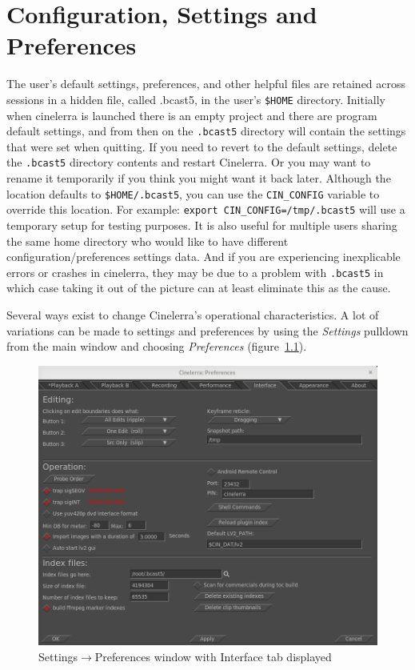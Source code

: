 
\chapter{Configuration, Settings and Preferences}%
\label{cha:configuration_settings_preferences}

The user's default settings, preferences, and other helpful files are retained across sessions in a hidden file, called .bcast5, in the user’s \texttt{\$HOME} directory. Initially when cinelerra is launched there is an empty project and there are program default settings, and from then on the \texttt{.bcast5} directory will contain the settings that were set when quitting.  If you need to revert to the default settings, delete the \texttt{.bcast5} directory contents and restart Cinelerra.  Or you may want to rename it temporarily if you think you might want it back later.
Although the location defaults to \texttt{\$HOME/.bcast5}, you can use the \texttt{CIN\_CONFIG} variable to override this location.  For example:  \texttt{export CIN\_CONFIG=/tmp/.bcast5}  will use a temporary setup for testing purposes.  It is also useful for multiple users sharing the same home directory who would like to have different configuration/preferences settings data.  And if you are experiencing inexplicable errors or crashes in cinelerra, they may be due to a problem with \texttt{.bcast5} in which case taking it out of the picture  can at least eliminate this as the cause.

Several ways exist to change Cinelerra’s operational characteristics.  A lot of variations can be made to  settings and preferences by using the \textit{Settings} pulldown from the main window and choosing \textit{Preferences} (figure~\ref{fig:settings}).

\begin{figure}[htpb]
    \centering \includegraphics[width=0.9\linewidth]{images/settings.png}
    \caption{Settings$\rightarrow$Preferences window with Interface tab displayed}
    \label{fig:settings}
\end{figure}

